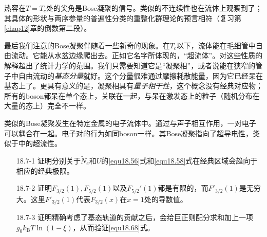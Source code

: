 热容在$T=T_c$处的尖角是Bose凝聚的信号。类似的不连续性也在流体上观察到了；其具体的形状与两序参量的普遍性分类的重整化群理论的预言相符（复习第\ref{chap12}章的倒数第二段）。

最后我们注意的Bose凝聚伴随着一些新奇的现象。在$T_c$以下，流体能在毛细管中自由流动。它能从水盆边缘爬出去。正如它名字所体现的，``超流体''。对这些性质的解释超出了统计力学的范围。我们只需要知道它是``凝聚相''，或者说能在狭窄的管子中自由流动的{\it 基态分量}就好。这个分量很难通过摩擦耗散能量，因为它已经呆在基态上了。更具有意义的是，凝聚相具有{\it 量子相干性}，这个概念没有经典对应物；所有的boson都呆在单个态上，关联在一起，与呆在激发态上的粒子（随机分布在大量的态上）完全不一样。

类似的Bose凝聚发生在特定金属的电子流体中。通过与声子相互作用，一对电子可以耦合在一起。电子对的行为如同boson一样。其Bose凝聚指向了超导电性，类似于中的超流性。

\begin{itemize}
\item[18.7-1] 证明分别关于$\tilde N_e$和$U$的\eqref{equ18.56}式和\eqref{equ18.58}式在经典区域会趋向于相应的经典极限。
\item[18.7-2] 证明$F_{3/2}(1),F_{5/2}(1)$以及$F_{5/2}'(1)$都是有限的，而$F'_{3/2}(1)$是无穷大。这里$F'_{3/2}(1)$代表$F_{3/2}(x)$在$x=1$处的导数值。
\item[18.7-3] 证明精确考虑了基态轨道的贡献之后，会给巨正则配分求和加上一项$g_0k_\text{B}T\ln(1-\xi)$，从而验证\eqref{equ18.68}式。
\end{itemize}
